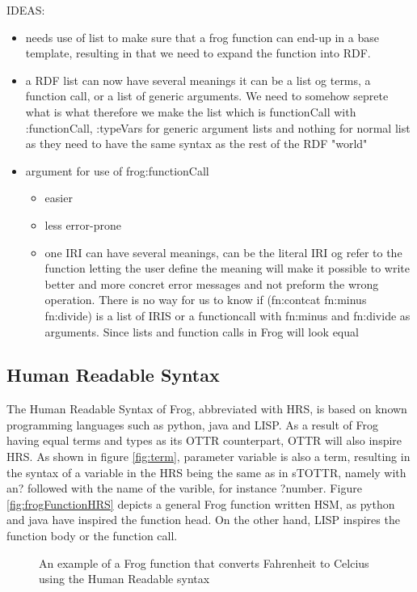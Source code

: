 \para 
IDEAS:
\begin{itemize}
    \item needs use of list to make sure that a frog function can end-up in a base template, resulting in that we need to expand the function into RDF. 
    \item a RDF list can now have several meanings it can be a list og terms, a function call, or a list of generic arguments. We need to somehow seprete what is what therefore we make the list which is functionCall with :functionCall, :typeVars for generic argument lists and nothing for normal list as they need to have the same syntax as the rest of the RDF "world"
    \item argument for use of frog:functionCall
    \begin{itemize}
        \item easier 
        \item less error-prone
        \item one IRI can have several meanings, can be the literal IRI og refer to the function letting the user define the meaning will make it possible to write better and more concret error messages and not preform the wrong operation. There is no way for us to know if (fn:contcat fn:minus fn:divide) is a list of IRIS or a functioncall with fn:minus and fn:divide as arguments. Since lists and function calls in Frog will look equal 
    \end{itemize}
\end{itemize}

\subsection{Human Readable Syntax}
The Human Readable Syntax of Frog, abbreviated with HRS, is based on known programming languages such as python, java and LISP. As a result of Frog having equal terms and types as its OTTR counterpart, OTTR will also inspire HRS. As shown in figure \ref{fig:term}, parameter variable is also a term, resulting in the syntax of a variable in the HRS being the same as in sTOTTR, namely with an? followed with the name of the varible, for instance ?number.  Figure \ref{fig:frogFunctionHRS} depicts a general Frog function written HSM, as python and java have inspired the function head. On the other hand, LISP inspires the function body or the function call. 

\begin{figure}[h]
    
    \caption{An example of a Frog function that converts Fahrenheit to Celcius using the Human Readable syntax}
    \label{fig:hrs_example}
\end{figure}

